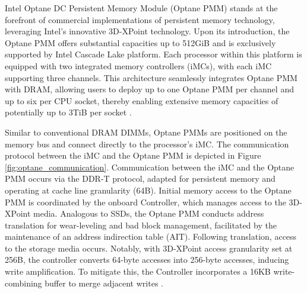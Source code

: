 Intel Optane DC Persistent Memory Module (Optane PMM) stands at the forefront of commercial implementations of persistent memory technology, leveraging Intel's innovative 3D-XPoint technology. Upon its introduction, the Optane PMM offers substantial capacities up to 512GiB and is exclusively supported by Intel Cascade Lake platform. Each processor within this platform is equipped with two integrated memory controllers (iMCs), with each iMC supporting three channels. This architecture seamlessly integrates Optane PMM with DRAM, allowing users to deploy up to one Optane PMM per channel and up to six per CPU socket, thereby enabling extensive memory capacities of potentially up to 3TiB per socket \cite{yang2020empirical,izraelevitz2019basic}.

Similar to conventional DRAM DIMMs, Optane PMMs are positioned on the memory bus and connect directly to the processor's iMC. The communication protocol between the iMC and the Optane PMM is depicted in Figure \ref{fig:optane_communication}.  Communication between the iMC and the Optane PMM occurs via the DDR-T protocol, adapted for persistent memory and operating at cache line granularity (64B). Initial memory access to the Optane PMM is coordinated by the onboard Controller, which manages access to the 3D-XPoint media. Analogous to SSDs, the Optane PMM conducts address translation for wear-leveling and bad block management, facilitated by the maintenance of an address indirection table (AIT). Following translation, access to the storage media occurs. Notably, with 3D-XPoint access granularity set at 256B, the controller converts 64-byte accesses into 256-byte accesses, inducing write amplification. To mitigate this, the Controller incorporates a 16KB write-combining buffer to merge adjacent writes \cite{yang2020empirical,izraelevitz2019basic,wu2020ribbon}.

